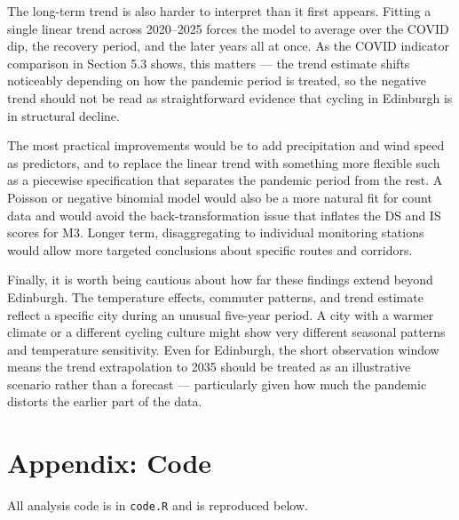 \documentclass[
]{article}
\begin{document}
The long-term trend is also harder to interpret than it first appears. Fitting a single linear trend across 2020--2025 forces the model to average over the COVID dip, the recovery period, and the later years all at once. As the COVID indicator comparison in Section 5.3 shows, this matters --- the trend estimate shifts noticeably depending on how the pandemic period is treated, so the negative trend should not be read as straightforward evidence that cycling in Edinburgh is in structural decline.

The most practical improvements would be to add precipitation and wind speed as predictors, and to replace the linear trend with something more flexible such as a piecewise specification that separates the pandemic period from the rest. A Poisson or negative binomial model would also be a more natural fit for count data and would avoid the back-transformation issue that inflates the DS and IS scores for M3. Longer term, disaggregating to individual monitoring
stations would allow more targeted conclusions about specific routes and corridors.

Finally, it is worth being cautious about how far these findings extend beyond Edinburgh. The temperature effects, commuter patterns, and trend estimate reflect a specific city during an unusual five-year period. A city with a warmer climate or a different cycling culture might show very different seasonal patterns and temperature sensitivity. Even for Edinburgh, the short observation window means the trend extrapolation to 2035 should be treated as an illustrative scenario rather than a forecast --- particularly given how much
the pandemic distorts the earlier part of the data.

\section{Appendix: Code}\label{appendix-code}

All analysis code is in \texttt{code.R} and is reproduced below.
\end{document}
